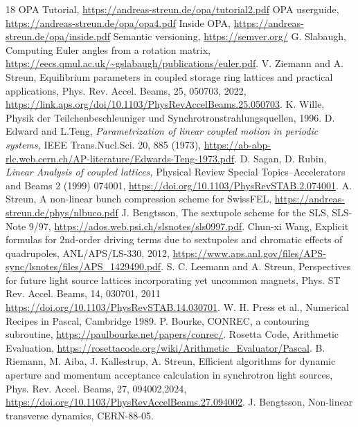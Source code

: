 \documentclass[12pt]{article}
\begin{document}
\begin{thebibliography}{18}
OPA Tutorial, \url{https://andreas-streun.de/opa/tutorial2.pdf}
OPA userguide, \url{https://andreas-streun.de/opa/opa4.pdf} 
Inside OPA, \url{https://andreas-streun.de/opa/inside.pdf} 
Semantic versioning, \url{https://semver.org/}
G. Slabaugh, Computing Euler angles from a rotation matrix, \url{https://eecs.qmul.ac.uk/~gslabaugh/publications/euler.pdf}.
V. Ziemann and A. Streun, Equilibrium parameters in coupled storage ring lattices and practical applications, Phys. Rev. Accel. Beams, 25, 050703, 2022, \url{https://link.aps.org/doi/10.1103/PhysRevAccelBeams.25.050703}.
K. Wille, Physik der Teilchenbeschleuniger und Synchrotronstrahlungsquellen, 1996.
 D. Edward and L.Teng, {\em Parametrization of linear coupled motion in periodic
systems,} IEEE Trans.Nucl.Sci. 20, 885 (1973), \url{https://ab-abp-rlc.web.cern.ch/AP-literature/Edwards-Teng-1973.pdf}.
D. Sagan, D. Rubin, {\em Linear Analysis of coupled lattices,} Physical Review Special
Topics--Accelerators and Beams 2 (1999) 074001, \url{https://doi.org/10.1103/PhysRevSTAB.2.074001}.
A. Streun, A non-linear bunch compression scheme for SwissFEL, \url{https://andreas-streun.de/phys/nlbuco.pdf}
J. Bengtsson, The sextupole scheme for the SLS, SLS-Note 9/97,  \url{https://ados.web.psi.ch/slsnotes/sls0997.pdf}.
Chun-xi Wang, Explicit formulas for 2nd-order driving terms due to sextupoles and chromatic effects of quadrupoles, ANL/APS/LS-330, 2012, \url{https://www.aps.anl.gov/files/APS-sync/lsnotes/files/APS_1429490.pdf}.
S. C. Leemann and A. Streun, Perspectives for future light source lattices incorporating yet uncommon magnets, Phys. ST Rev. Accel. Beams, 14, 030701, 2011 \url{https://doi.org/10.1103/PhysRevSTAB.14.030701}.
W. H. Press et al., Numerical Recipes in Pascal, Cambridge 1989.
P. Bourke, CONREC, a contouring subroutine, \url{https://paulbourke.net/papers/conrec/}.
Rosetta Code, Arithmetic Evaluation, \url{https://rosettacode.org/wiki/Arithmetic\_Evaluator/Pascal}.
B. Riemann, M. Aiba, J. Kallestrup, A. Streun, Efficient algorithms for dynamic aperture and momentum acceptance calculation in synchrotron light sources, Phys. Rev. Accel. Beams, 27, 094002,2024, \url{https://doi.org/10.1103/PhysRevAccelBeams.27.094002}.
J. Bengtsson, Non-linear transverse dynamics, CERN-88-05.
\end{thebibliography}
\end{document}
